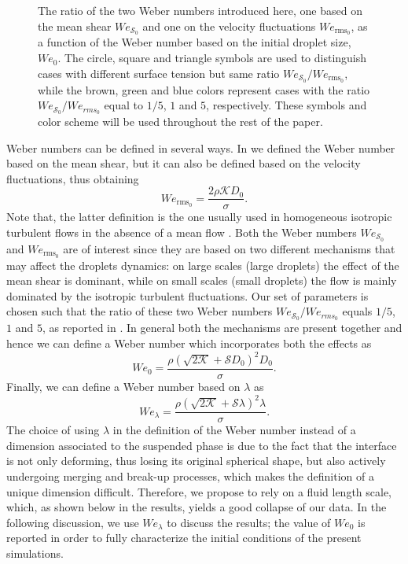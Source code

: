\begin{figure}
	\centering
	 \vspace{0.5cm}
	\caption{The ratio of the two Weber numbers introduced here, one based on the mean shear $We_{\mathcal{S}_0}$ and one on the velocity fluctuations $We_{\textrm{rms}_0}$, as a function of the Weber number based on the initial droplet size, $We_0$. The circle, square and triangle symbols are used to distinguish cases with different surface tension but same ratio $We_{\mathcal{S}_0}/We_{\textrm{rms}_0}$, while the brown, green and blue colors represent cases with the ratio $We_{\mathcal{S}_0}/We_{{rms}_0}$ equal to $1/5$, $1$ and $5$, respectively. These symbols and color scheme will be used throughout the rest of the paper.}
	\label{fig:Web}
\end{figure}
Weber numbers can be defined in several ways. In  we defined the Weber number based on the mean shear, but it can also be defined based on the velocity fluctuations, thus obtaining
\begin{equation}
\label{eq:werms}
We_{\textrm{rms}_0} = \frac{2 \rho \mathcal{K} D_0}{\sigma}.
\end{equation}
Note that, the latter definition is the one usually used in homogeneous isotropic turbulent flows in the absence of a mean flow \citep{dodd_ferrante_2016a}. Both the Weber numbers $We_{\mathcal{S}_0}$ and $We_{\textrm{rms}_0}$ are of interest since they are based on two different mechanisms that may affect the droplets dynamics: on large scales (large droplets) the effect of the mean shear is dominant, while on small scales (small droplets) the flow is mainly dominated by the isotropic turbulent fluctuations. Our set of parameters is chosen such that the ratio of these two Weber numbers $We_{\mathcal{S}_0}/We_{{rms}_0}$ equals $1/5$, $1$ and $5$, as reported in . In general both the mechanisms are present together and hence we can define a Weber number which incorporates both the effects as
\begin{equation}
\label{eq:we0}
We_0 = \frac{\rho \left( \sqrt{2\mathcal{K}} + \mathcal{S} D_0 \right)^2 D_0}{\sigma}.
\end{equation}
Finally, we can define a Weber number based on $\lambda$ as
\begin{equation}
\label{eq:wel}
We_\lambda = \frac{\rho \left( \sqrt{2\mathcal{K}} + \mathcal{S} \lambda \right)^2 \lambda}{\sigma}.
\end{equation}
The choice of using $\lambda$ in the definition of the Weber number instead of a dimension associated to the suspended phase is due to the fact that the interface is not only deforming, thus losing its original spherical shape, but also actively undergoing merging and break-up processes, which makes the definition of a unique dimension difficult. Therefore, we propose to rely on a fluid length scale, which, as shown below in the results, yields a good collapse of our data. In the following discussion, we use $We_\lambda$ to discuss the results; the value of $We_0$ is reported in order to fully characterize the initial conditions of the present simulations.

